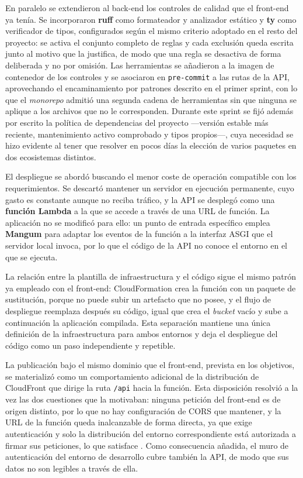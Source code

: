 En paralelo se extendieron al back-end los controles de calidad que el front-end
ya tenía. Se incorporaron \textbf{ruff} como formateador y analizador estático y
\textbf{ty} como verificador de tipos, configurados según el mismo criterio
adoptado en el resto del proyecto: se activa el conjunto completo de reglas y
cada exclusión queda escrita junto al motivo que la justifica, de modo que una
regla se desactiva de forma deliberada y no por omisión. Las herramientas se
añadieron a la imagen de contenedor de los controles y se asociaron en
\texttt{pre-commit} a las rutas de la API, aprovechando el encaminamiento por
patrones descrito en el primer sprint, con lo que el \textit{monorepo} admitió
una segunda cadena de herramientas sin que ninguna se aplique a los archivos que
no le corresponden. Durante este sprint se fijó además por escrito la política de
dependencias del proyecto —versión estable más reciente, mantenimiento activo
comprobado y tipos propios—, cuya necesidad se hizo evidente al tener que
resolver en pocos días la elección de varios paquetes en dos ecosistemas
distintos.

El despliegue se abordó buscando el menor coste de operación compatible con los
requerimientos. Se descartó mantener un servidor en ejecución permanente, cuyo
gasto es constante aunque no reciba tráfico, y la API se desplegó como una
\textbf{función Lambda} a la que se accede a través de una URL de función. La
aplicación no se modificó para ello: un punto de entrada específico emplea
\textbf{Mangum} para adaptar los eventos de la función a la interfaz ASGI que el
servidor local invoca, por lo que el código de la API no conoce el entorno en el
que se ejecuta.

La relación entre la plantilla de infraestructura y el código sigue el mismo
patrón ya empleado con el front-end: CloudFormation crea la función con un
paquete de sustitución, porque no puede subir un artefacto que no posee, y el
flujo de despliegue reemplaza después su código, igual que crea el \textit{bucket}
vacío y sube a continuación la aplicación compilada. Esta separación mantiene una
única definición de la infraestructura para ambos entornos y deja el despliegue
del código como un paso independiente y repetible.

La publicación bajo el mismo dominio que el front-end, prevista en los objetivos,
se materializó como un comportamiento adicional de la distribución de CloudFront
que dirige la ruta \texttt{/api} hacia la función. Esta disposición resolvió a la
vez las dos cuestiones que la motivaban: ninguna petición del front-end es de
origen distinto, por lo que no hay configuración de CORS que mantener, y la URL
de la función queda inalcanzable de forma directa, ya que exige autenticación y
solo la distribución del entorno correspondiente está autorizada a firmar sus
peticiones, lo que satisface . Como consecuencia añadida, el
muro de autenticación del entorno de desarrollo cubre también la API, de modo que
sus datos no son legibles a través de ella.

